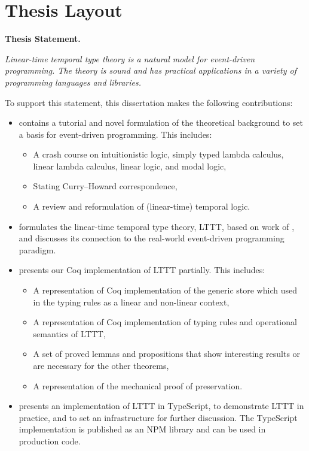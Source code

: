 \section{Thesis Layout}

\textbf{Thesis Statement.}

\textit{Linear-time temporal type theory is a natural model for event-driven programming. The theory is sound and has practical applications in a variety of programming languages and libraries.}

To support this statement, this dissertation makes the following contributions:

\begin{itemize}
    \item {} contains a tutorial and novel formulation of the theoretical background to set a basis for event-driven programming. This includes:
    \begin{itemize}
        \item A crash course on intuitionistic logic, simply typed lambda calculus, linear lambda calculus, linear logic, and modal logic,
        \item Stating Curry--Howard correspondence,
        \item A review and reformulation of (linear-time) temporal logic.
    \end{itemize}
    \item {} formulates the linear-time temporal type theory, LTTT, based on work of \cite{Paykin2016TheEO}, and discusses its connection to the real-world event-driven programming paradigm.
    \item {} presents our Coq implementation of LTTT partially. This includes:
    \begin{itemize}
        \item A representation of Coq implementation of the generic store which used in the typing rules as a linear and non-linear context,
        \item A representation of Coq implementation of typing rules and operational semantics of LTTT,
        \item A set of proved lemmas and propositions that show interesting results or are necessary for the other theorems,
        \item A representation of the mechanical proof of preservation.
    \end{itemize}
    \item {} presents an implementation of LTTT in TypeScript, to demonstrate LTTT in practice, and to set an infrastructure for further discussion. The TypeScript implementation is published as an NPM library and can be used in production code.
\end{itemize}
